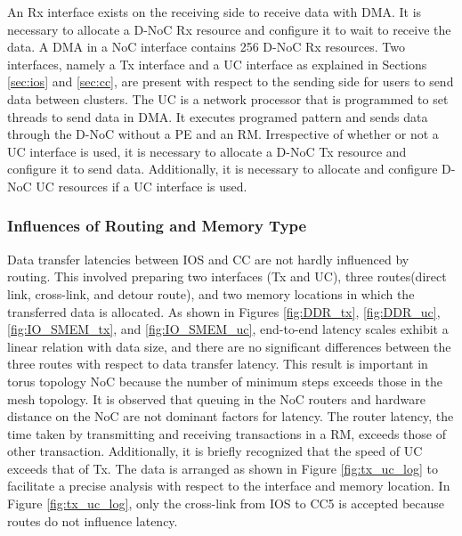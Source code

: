 \documentclass[conference,compsoc]{IEEEtran}
\newcommand{\comment}[1]{}
\begin{document}
An Rx interface exists on the receiving side to receive data with DMA.
It is necessary to allocate a D-NoC Rx resource and configure it to wait to receive the data.
A DMA in a NoC interface contains 256 D-NoC Rx resources.
Two interfaces, namely a Tx interface and a UC interface as explained in Sections \ref{sec:ios} and \ref{sec:cc},
are present with respect to the sending side for users to send data between clusters.
The UC is a network processor that is programmed to set threads to send data in DMA.
It executes programed pattern and sends data through the D-NoC without a PE and an RM.
Irrespective of whether or not a UC interface is used, it is necessary to allocate a D-NoC Tx resource and configure it to send data.
Additionally, it is necessary to allocate and configure D-NoC UC resources if a UC interface is used.

\vspace{-3mm}
\subsubsection{Influences of Routing and Memory Type}
\label{sec:routing_and_memory}

\comment{1-20, 1-21}
Data transfer latencies between IOS and CC are not hardly influenced by routing.
This involved preparing two interfaces (Tx and UC), three routes(direct link, cross-link, and detour route), and two memory locations in which the transferred data is allocated.
As shown in Figures \ref{fig:DDR_tx}, \ref{fig:DDR_uc}, \ref{fig:IO_SMEM_tx}, and \ref{fig:IO_SMEM_uc}, 
end-to-end latency scales exhibit a linear relation with data size, and there are no significant differences between the three routes with respect to data transfer latency.
This result is important in torus topology NoC because the number of minimum steps exceeds those in the mesh topology. 
It is observed that queuing in the NoC routers and hardware distance on the NoC are not dominant factors for latency.
The router latency, the time taken by transmitting and receiving transactions in a RM, exceeds those of other transaction.
Additionally, it is briefly recognized that the speed of UC exceeds that of Tx.
The data is arranged as shown in Figure \ref{fig:tx_uc_log} to facilitate a precise analysis with respect to the interface and memory location.
In Figure \ref{fig:tx_uc_log}, only the cross-link from IOS to CC5 is accepted because routes do not influence latency.
\end{document}
